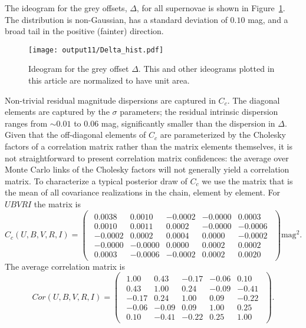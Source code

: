 \documentclass{aastex61}   	%
\begin{document}
The ideogram for the grey offsets, $\Delta$, for all supernovae is shown in Figure~\ref{hist:fig}.  The distribution is non-Gaussian, 
has a standard deviation of
$0.10$
mag, and a broad tail in the positive (fainter) direction.
\begin{figure}[htbp] %
   \centering
   \texttt{[image: output11/Delta\_hist.pdf]} 
   \caption{Ideogram for the grey offset $\Delta$.  This and other ideograms plotted in this article are normalized to have unit area.
   \label{hist:fig}}
\end{figure}


Non-trivial residual magnitude dispersions are captured in $C_c$.  The diagonal elements are captured by the $\sigma$ parameters;
the residual intrinsic dispersion ranges from
$\sim 0.01$ to 0.06 mag, significantly smaller
than the dispersion in $\Delta$.  Given that the 
off-diagonal elements of $C_c$ are parameterized by the Cholesky factors of a correlation matrix rather than the matrix elements themselves,
it is not straightforward to present correlation matrix confidences:
the average over Monte Carlo links of the
Cholesky factors will not  generally yield a correlation matrix.  
To characterize a typical posterior draw of $C_c$ we use the matrix that is the mean of all covariance realizations in the
chain, element by element.
For $UBVRI$ the matrix is
\begin{equation}
C_c(U,B,V,R,I)=
\begin{pmatrix}
\begin{array}{rrrrr}
0.0038 & 0.0010 & -0.0002 & -0.0000 & 0.0003 \\
0.0010 & 0.0011 & 0.0002 & -0.0000 & -0.0006 \\
-0.0002 & 0.0002 & 0.0004 & 0.0000 & -0.0002 \\
-0.0000 & -0.0000 & 0.0000 & 0.0002 & 0.0002 \\
0.0003 & -0.0006 & -0.0002 & 0.0002 & 0.0020
\end{array}
 \end{pmatrix} \text{mag}^2.
 \label{mag_cov:eqn}
 \end{equation}
\color{red}
The average correlation matrix is
\begin{equation}
Cor(U,B,V,R,I)=
\begin{pmatrix}
\begin{array}{rrrrr}
1.00 & 0.43 & -0.17 & -0.06 & 0.10 \\
0.43 & 1.00 & 0.24 & -0.09 & -0.41 \\
-0.17 & 0.24 & 1.00 & 0.09 & -0.22 \\
-0.06 & -0.09 & 0.09 & 1.00 & 0.25 \\
0.10 & -0.41 & -0.22 & 0.25 & 1.00
\end{array}
 \end{pmatrix}.
 \end{equation}
\end{document}
